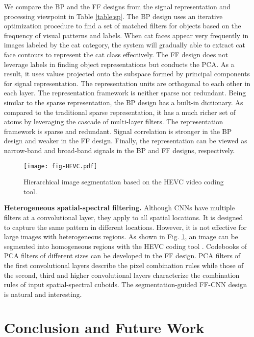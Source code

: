 \documentclass[preprint,12pt]{elsarticle}
\begin{document}
We compare the BP and the FF designs from the signal representation and
processing viewpoint in Table \ref{table:sp}. The BP design uses an
iterative optimization procedure to find a set of matched filters for
objects based on the frequency of visual patterns and labels. When cat
faces appear very frequently in images labeled by the cat category, the
system will gradually able to extract cat face contours to represent the
cat class effectively. The FF design does not leverage labels in finding
object representations but conducts the PCA. As a result, it uses values
projected onto the subspace formed by principal components for signal
representation. The representation units are orthogonal to each other in
each layer.  The representation framework is neither sparse nor
redundant.  Being similar to the sparse representation, the BP design
has a built-in dictionary.  As compared to the traditional sparse
representation, it has a much richer set of atoms by leveraging the
cascade of multi-layer filters.  The representation framework is sparse
and redundant. Signal correlation is stronger in the BP design and
weaker in the FF design. Finally, the representation can be viewed as
narrow-band and broad-band signals in the BP and FF designs,
respectively. 

\begin{figure}[htb]
\centering
\texttt{[image: fig-HEVC.pdf]}
\caption{Hierarchical image segmentation based on the HEVC 
video coding tool.}\label{fig:HEVC}
\end{figure}

{\bf Heterogeneous spatial-spectral filtering.} Although CNNs have
multiple filters at a convolutional layer, they apply to all spatial
locations. It is designed to capture the same pattern in different
locations. However, it is not effective for large images with
heterogeneous regions. As shown in Fig.  \ref{fig:HEVC}, an image can be
segmented into homogeneous regions with the HEVC coding tool
\cite{sullivan2012overview}.  Codebooks of PCA filters of different
sizes can be developed in the FF design.  PCA filters of the first
convolutional layers describe the pixel combination rules while those of
the second, third and higher convolutional layers characterize the
combination rules of input spatial-spectral cuboids.  The
segmentation-guided FF-CNN design is natural and interesting. 

\section{Conclusion and Future Work}\label{sec:conclusion}
\end{document}
